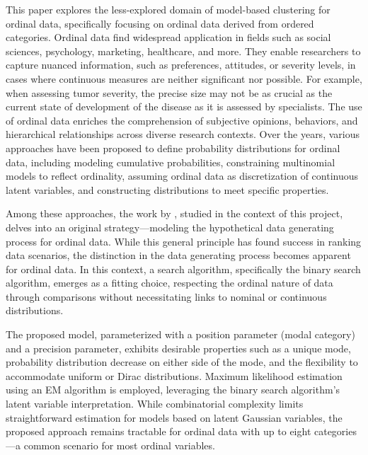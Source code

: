 \documentclass[a4paper,12pt]{article}
\begin{document}
This paper explores the less-explored domain of model-based clustering for ordinal data, specifically focusing on ordinal data derived from ordered categories. Ordinal data find widespread application in fields such as social sciences, psychology, marketing, healthcare, and more. They enable researchers to capture nuanced information, such as preferences, attitudes, or severity levels, in cases where continuous measures are neither significant nor possible. For example, when assessing tumor severity, the precise size may not be as crucial as the current state of development of the disease as it is assessed by specialists. The use of ordinal data enriches the comprehension of subjective opinions, behaviors, and hierarchical relationships across diverse research contexts. Over the years, various approaches have been proposed to define probability distributions for ordinal data, including modeling cumulative probabilities, constraining multinomial models to reflect ordinality, assuming ordinal data as discretization of continuous latent variables, and constructing distributions to meet specific properties.

Among these approaches, the work by \cite{biernacki2016model}, studied in the context of this project, delves into an original strategy—modeling the hypothetical data generating process for ordinal data. While this general principle has found success in ranking data scenarios, the distinction in the data generating process becomes apparent for ordinal data. In this context, a search algorithm, specifically the binary search algorithm, emerges as a fitting choice, respecting the ordinal nature of data through comparisons without necessitating links to nominal or continuous distributions.

The proposed model, parameterized with a position parameter (modal category) and a precision parameter, exhibits desirable properties such as a unique mode, probability distribution decrease on either side of the mode, and the flexibility to accommodate uniform or Dirac distributions. Maximum likelihood estimation using an EM algorithm is employed, leveraging the binary search algorithm's latent variable interpretation. While combinatorial complexity limits straightforward estimation for models based on latent Gaussian variables, the proposed approach remains tractable for ordinal data with up to eight categories—a common scenario for most ordinal variables.
\end{document}
